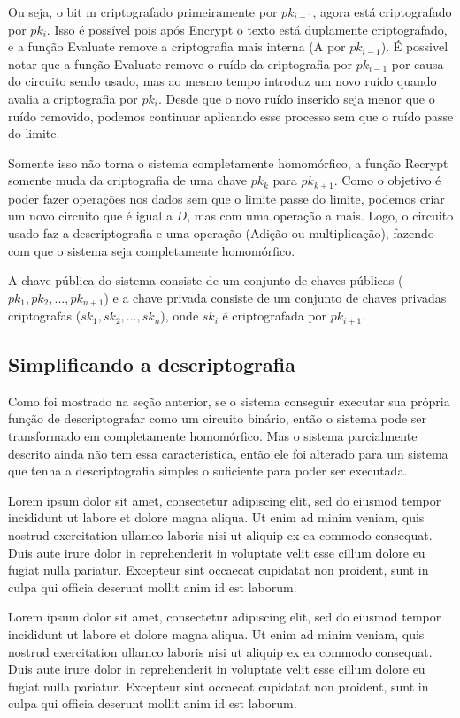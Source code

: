 	Ou seja, o bit m criptografado primeiramente por \( pk_{i-1} \), agora está criptografado por \( pk_{i} \).
	Isso é possível pois após Encrypt o texto está duplamente criptografado, e a função Evaluate remove a criptografia mais interna (A por \(pk_{i-1}\)).
	É possivel notar que a função Evaluate remove o ruído da criptografia por \(pk_{i-1}\) por causa do circuito sendo usado, mas ao mesmo tempo introduz um novo ruído quando avalia a criptografia por \(pk_i\).
	Desde que o novo ruído inserido seja menor que o ruído removido, podemos continuar aplicando esse processo sem que o ruído passe do limite.
  
	Somente isso não torna o sistema completamente homomórfico, a função Recrypt somente muda da criptografia de uma chave \(pk_k\) para \(pk_{k+1}\).
	Como o objetivo é poder fazer operações nos dados sem que o limite passe do limite, podemos criar um novo circuito que é igual a \(D\), mas com uma operação a mais.
	Logo, o circuito usado faz a descriptografia e uma operação (Adição ou multiplicação), fazendo com que o sistema seja completamente homomórfico.
  
	A chave pública do sistema consiste de um conjunto de chaves públicas (\(pk_1, pk_2, ..., pk_{n+1}\)) e a chave privada consiste de um conjunto de chaves privadas criptografas (\(sk_1, sk_2, ..., sk_n\)), onde \(sk_i\) é criptografada por \(pk_{i+1}\).

	\subsection{Simplificando a descriptografia}
	Como foi mostrado na seção anterior, se o sistema conseguir executar sua própria função de descriptografar como um circuito binário, então o sistema pode ser transformado em completamente homomórfico.
  Mas o sistema parcialmente descrito ainda não tem essa caracteristica, então ele foi alterado para um sistema que tenha a descriptografia simples o suficiente para poder ser executada.
  
	Lorem ipsum dolor sit amet, consectetur adipiscing elit, sed do eiusmod tempor incididunt ut labore et dolore magna aliqua. Ut enim ad minim veniam, quis nostrud exercitation ullamco laboris nisi ut aliquip ex ea commodo consequat. Duis aute irure dolor in reprehenderit in voluptate velit esse cillum dolore eu fugiat nulla pariatur. Excepteur sint occaecat cupidatat non proident, sunt in culpa qui officia deserunt mollit anim id est laborum.
	
	Lorem ipsum dolor sit amet, consectetur adipiscing elit, sed do eiusmod tempor incididunt ut labore et dolore magna aliqua. Ut enim ad minim veniam, quis nostrud exercitation ullamco laboris nisi ut aliquip ex ea commodo consequat. Duis aute irure dolor in reprehenderit in voluptate velit esse cillum dolore eu fugiat nulla pariatur. Excepteur sint occaecat cupidatat non proident, sunt in culpa qui officia deserunt mollit anim id est laborum.
  
